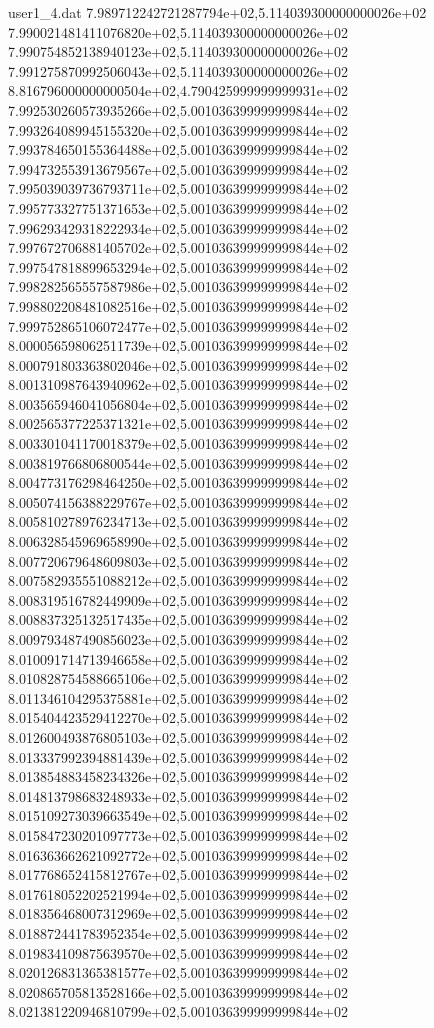 \begin{filecontents}{user1_4.dat}
7.989712242721287794e+02,5.114039300000000026e+02
7.990021481411076820e+02,5.114039300000000026e+02
7.990754852138940123e+02,5.114039300000000026e+02
7.991275870992506043e+02,5.114039300000000026e+02
8.816796000000000504e+02,4.790425999999999931e+02
7.992530260573935266e+02,5.001036399999999844e+02
7.993264089945155320e+02,5.001036399999999844e+02
7.993784650155364488e+02,5.001036399999999844e+02
7.994732553913679567e+02,5.001036399999999844e+02
7.995039039736793711e+02,5.001036399999999844e+02
7.995773327751371653e+02,5.001036399999999844e+02
7.996293429318222934e+02,5.001036399999999844e+02
7.997672706881405702e+02,5.001036399999999844e+02
7.997547818899653294e+02,5.001036399999999844e+02
7.998282565557587986e+02,5.001036399999999844e+02
7.998802208481082516e+02,5.001036399999999844e+02
7.999752865106072477e+02,5.001036399999999844e+02
8.000056598062511739e+02,5.001036399999999844e+02
8.000791803363802046e+02,5.001036399999999844e+02
8.001310987643940962e+02,5.001036399999999844e+02
8.003565946041056804e+02,5.001036399999999844e+02
8.002565377225371321e+02,5.001036399999999844e+02
8.003301041170018379e+02,5.001036399999999844e+02
8.003819766806800544e+02,5.001036399999999844e+02
8.004773176298464250e+02,5.001036399999999844e+02
8.005074156388229767e+02,5.001036399999999844e+02
8.005810278976234713e+02,5.001036399999999844e+02
8.006328545969658990e+02,5.001036399999999844e+02
8.007720679648609803e+02,5.001036399999999844e+02
8.007582935551088212e+02,5.001036399999999844e+02
8.008319516782449909e+02,5.001036399999999844e+02
8.008837325132517435e+02,5.001036399999999844e+02
8.009793487490856023e+02,5.001036399999999844e+02
8.010091714713946658e+02,5.001036399999999844e+02
8.010828754588665106e+02,5.001036399999999844e+02
8.011346104295375881e+02,5.001036399999999844e+02
8.015404423529412270e+02,5.001036399999999844e+02
8.012600493876805103e+02,5.001036399999999844e+02
8.013337992394881439e+02,5.001036399999999844e+02
8.013854883458234326e+02,5.001036399999999844e+02
8.014813798683248933e+02,5.001036399999999844e+02
8.015109273039663549e+02,5.001036399999999844e+02
8.015847230201097773e+02,5.001036399999999844e+02
8.016363662621092772e+02,5.001036399999999844e+02
8.017768652415812767e+02,5.001036399999999844e+02
8.017618052202521994e+02,5.001036399999999844e+02
8.018356468007312969e+02,5.001036399999999844e+02
8.018872441783952354e+02,5.001036399999999844e+02
8.019834109875639570e+02,5.001036399999999844e+02
8.020126831365381577e+02,5.001036399999999844e+02
8.020865705813528166e+02,5.001036399999999844e+02
8.021381220946810799e+02,5.001036399999999844e+02

\end{filecontents}
